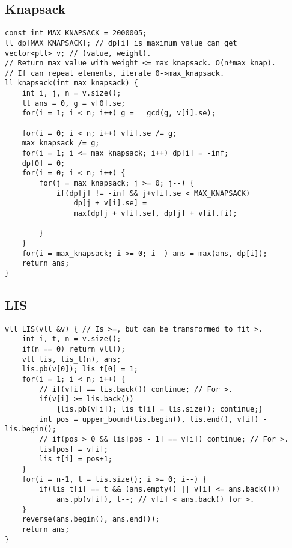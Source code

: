 \documentclass[a4paper]{article}
\begin{document}
\subsection*{Knapsack}
\begin{multicols}{2}
\begin{verbatim}
const int MAX_KNAPSACK = 2000005;
ll dp[MAX_KNAPSACK]; // dp[i] is maximum value can get
vector<pll> v; // (value, weight).
// Return max value with weight <= max_knapsack. O(n*max_knap).
// If can repeat elements, iterate 0->max_knapsack.
ll knapsack(int max_knapsack) {
    int i, j, n = v.size();
    ll ans = 0, g = v[0].se;
    for(i = 1; i < n; i++) g = __gcd(g, v[i].se);
    
    for(i = 0; i < n; i++) v[i].se /= g;
    max_knapsack /= g;
    for(i = 1; i <= max_knapsack; i++) dp[i] = -inf;
    dp[0] = 0;
    for(i = 0; i < n; i++) {
        for(j = max_knapsack; j >= 0; j--) {
            if(dp[j] != -inf && j+v[i].se < MAX_KNAPSACK)
                dp[j + v[i].se] = 
                max(dp[j + v[i].se], dp[j] + v[i].fi);
                
        }
    }
    for(i = max_knapsack; i >= 0; i--) ans = max(ans, dp[i]);
    return ans;
}
\end{verbatim}
\end{multicols}
\subsection*{LIS}
\begin{multicols}{2}
\begin{verbatim}
vll LIS(vll &v) { // Is >=, but can be transformed to fit >.
    int i, t, n = v.size();
    if(n == 0) return vll();
    vll lis, lis_t(n), ans;
    lis.pb(v[0]); lis_t[0] = 1;
    for(i = 1; i < n; i++) {
        // if(v[i] == lis.back()) continue; // For >.
        if(v[i] >= lis.back())
            {lis.pb(v[i]); lis_t[i] = lis.size(); continue;}
        int pos = upper_bound(lis.begin(), lis.end(), v[i]) - lis.begin();
        // if(pos > 0 && lis[pos - 1] == v[i]) continue; // For >.
        lis[pos] = v[i];
        lis_t[i] = pos+1;
    }
    for(i = n-1, t = lis.size(); i >= 0; i--) {
        if(lis_t[i] == t && (ans.empty() || v[i] <= ans.back()))
            ans.pb(v[i]), t--; // v[i] < ans.back() for >.
    }
    reverse(ans.begin(), ans.end());
    return ans;
}
\end{verbatim}
\end{multicols}
\end{document}
